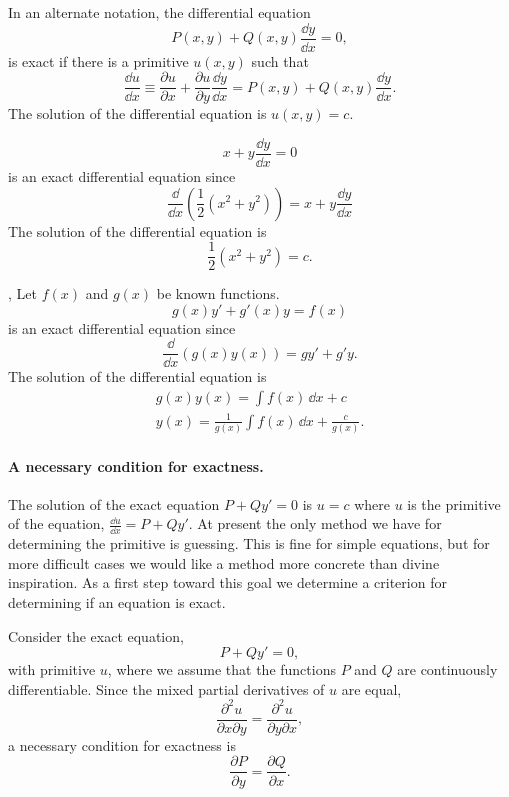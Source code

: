 In an alternate notation, the differential equation
\begin{equation}
  \label{first_order_first_degree}
  P(x, y) + Q(x, y) \frac{\dd y}{\dd x} = 0,
\end{equation}
is exact if there is a primitive $u(x, y)$ such that
\[
\frac{\dd u}{\dd x} \equiv \frac{\partial u}{\partial x} + \frac{\partial u}{\partial y} \frac{\dd y}{\dd x}
= P(x, y) + Q(x, y) \frac{\dd y}{\dd x}.
\]
The solution of the differential equation is $u(x, y) = c$.





\begin{Example}
  \[
  x + y \frac{\dd y}{\dd x} = 0
  \]
  is an exact differential equation since
  \[
  \frac{\dd}{\dd x} \left( \frac{1}{2} (x^2 + y^2) \right) = x + y \frac{\dd y}{\dd x}
  \]
  The solution of the differential equation is
  \[
  \frac{1}{2} (x^2 + y^2) = c.
  \]
\end{Example}




\begin{Example}
  \label{product_rule_exact_equation},
  Let $f(x)$ and $g(x)$ be known functions.
  \[
  g(x) y' + g'(x) y = f(x)
  \]
  is an exact differential equation since
  \[
  \frac{\dd}{\dd x} \left( g(x) y(x) \right) = g y' + g' y.
  \]
  The solution of the differential equation is
  \begin{gather*}
    g(x) y(x) = \int f(x)\,\dd x + c \\
    y(x) = \frac{1}{g(x)} \int f(x) \,\dd x + \frac{c}{g(x)}.
  \end{gather*}
\end{Example}



\paragraph{A necessary condition for exactness.}
The solution of the exact equation $P + Q y' = 0$ is $u = c$
where $u$ is the primitive of the equation,  $\frac{\dd u}{\dd x} = P + Q y'$.
At present the only method we have for determining the primitive is 
guessing.   This is fine for simple equations, but for more difficult
cases we would like a method more concrete than divine inspiration.  As a
first step toward this goal we determine a criterion for determining if
an equation is exact.

Consider the exact equation,
\[
P + Q y' = 0,
\]
with primitive $u$, where we assume that the functions $P$ and $Q$ are 
continuously differentiable.  Since the mixed partial derivatives of $u$ 
are equal,
\[
\frac{\partial^2 u}{\partial x \partial y} = \frac{\partial^2 u}{\partial y \partial x},
\]
a necessary condition for exactness is
\[
\frac{\partial P}{\partial y} = \frac{\partial Q}{\partial x}.
\]



